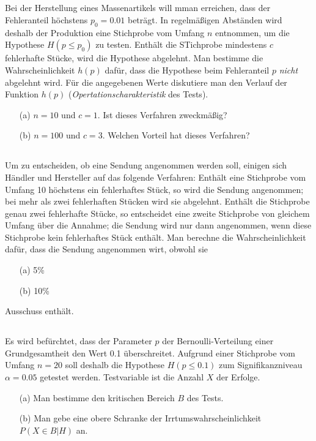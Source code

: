 \documentclass[ngerman]{scrartcl}
\begin{document}
\subsection{}
Bei der Herstellung eines Massenartikels will mman erreichen, dass der Fehleranteil höchstens $p_0=0.01$ beträgt. In regelmäßigen Abständen wird deshalb der Produktion eine Stichprobe vom Umfang $n$ entnommen, um die Hypothese $H(p\leq p_0)$ zu testen. Enthält die STichprobe mindestens $c$ fehlerhafte Stücke, wird die Hypothese abgelehnt. Man bestimme die Wahrscheinlichkeit $h(p)$ dafür, dass die Hypothese beim Fehleranteil $p$ \textit{nicht} abgelehnt wird. Für die angegebenen Werte diskutiere man den Verlauf der Funktion $h(p)$ (\textit{Opertationscharakteristik} des Tests).
\begin{enumerate}
	\item[(a)] $n=10$ und $c=1$. Ist dieses Verfahren zweckmäßig?
	\item[(b)] $n=100$ und $c=3$. Welchen Vorteil hat dieses Verfahren?
\end{enumerate}


\subsection{}
Um zu entscheiden, ob eine Sendung angenommen werden soll, einigen sich Händler und Hersteller auf das folgende Verfahren: Enthält eine Stichprobe vom Umfang 10 höchstens ein fehlerhaftes Stück, so wird die Sendung angenommen; bei mehr als zwei fehlerhaften Stücken wird sie abgelehnt. Enthält die Stichprobe genau zwei fehlerhafte Stücke, so entscheidet eine zweite Stichprobe von gleichem Umfang über die Annahme; die Sendung wird nur dann angenommen, wenn diese Stichprobe kein fehlerhaftes Stück enthält. Man berechne die Wahrscheinlichkeit dafür, dass die Sendung angenommen wirt, obwohl sie 
\begin{enumerate}
	\item[(a)] 5\%
	\item[(b)] 10\%
\end{enumerate}
Ausschuss enthält.

\subsection{}
Es wird befürchtet, dass der Parameter $p$ der Bernoulli-Verteilung einer Grundgesamtheit den Wert 0.1 überschreitet. Aufgrund einer Stichprobe vom Umfang $n=20$ soll deshalb die Hypothese $H(p\leq 0.1)$ zum Signifikanzniveau $\alpha = 0.05$ getestet werden. Testvariable ist die Anzahl $X$ der Erfolge.
\begin{enumerate}
	\item[(a)] Man bestimme den kritischen Bereich $B$ des Tests.
	\item[(b)] Man gebe eine obere Schranke der Irrtumswahrscheinlichkeit $P(X\in B | H)$ an.
\end{enumerate}
\end{document}
